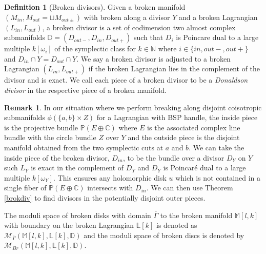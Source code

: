 \documentclass[11pt, oneside,dvipsnames]{amsart}
\newcommand{\<}{\langle}
\renewcommand{\>}{\rangle}
\newcommand{\inn}{{in}}
\newcommand{\out}{{out}}
\newcommand{\outp}{{out+}}
\newcommand{\outm}{{out-}}
\newcommand{\bC}{\mathbb{C}}
\newcommand{\bD}{\mathbb{D}}
\newcommand{\bN}{\mathbb{N}}
\newcommand{\bP}{\mathbb{P}}
\theoremstyle{definition}
\theoremstyle{definition}
\newtheorem{remark}[Theorem]{Remark}
\newtheorem{defn}[Theorem]{Definition}
\numberwithin{equation}{subsection}
\begin{document}
\begin{defn}[Broken divisors]\label{def:div}
    Given a broken manifold $(M_\inn, M_\out = \sqcup M_{out\pm})$ with broken along a divisor $Y$ and a broken Lagrangian $(L_\inn,L_\out)$,
    a broken divisor is a set of codimension two almost complex submanifolds $\bD = (D_\outm, D_\inn, D_\outp)$ such that $D_i$ is 
    Poincare dual to a large multiple $k[\omega_i]$ of the symplectic class for $k\in \bN$ where $i\in \{ \inn, \outm, \outp  \}$ and $D_\inn \cap Y = D_\out \cap Y$.
    We say a broken divisor is adjusted to a broken Lagrangian $(L_\inn,L_\outp)$ if the broken Lagrangian lies in the complement
    of the divisor and is exact. We call each piece of a broken divisor to be a \textit{Donaldson divisor} in the respective piece of a broken manifold.
\end{defn}
\begin{remark}
In our situation where we perform breaking along disjoint coisotropic submanifolds $\phi(\{a,b\} \times Z)$ for a Lagrangian with BSP handle, the inside piece is the projective bundle $\bP ( E \oplus \bC )$ where $E$ is the associated complex line bundle with the circle bundle $Z$ over $Y$ and the outside piece is the disjoint manifold obtained from the two symplectic cuts at $a$ and $b$. We can take the inside piece of the broken divisor, $D_\inn$, to be the bundle over a divisor $D_Y$ on $Y$ such $L_Y$ is exact in the complement of $D_Y$ and $D_Y$ is Poincar{\'e} dual to a large multiple $k[\omega_Y]$. This ensures any holomorphic disk $u$ which is not contained in a single fiber of $\bP(E\oplus \bC)$ intersects with $D_\inn$. We can then use Theorem \ref{brokdiv} to find divisors in the potentially disjoint outer pieces.
\end{remark}




The moduli space of broken disks with domain $\overline{\Gamma}$ to the broken manifold $\mathbb{M}[l,k]$ with boundary on the broken Lagrangian $\mathbb{L}[k]$  is denoted as $\mathcal{M}_{\overline{\Gamma}}(\mathbb{M}[l,k],\mathbb{L}[k],\bD)$ and the moduli space of broken discs is denoted by $\mathcal{M}_{Br}(\mathbb{M}[l,k],\mathbb{L}[k],\bD)$.
\end{document}
